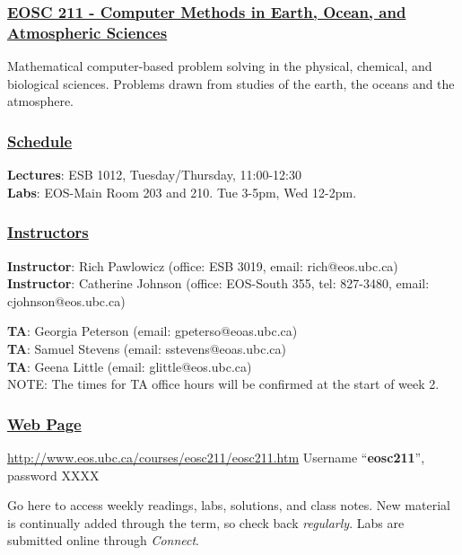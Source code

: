 \documentclass[12pt]{article}
\renewcommand{\section}[1]{\vspace{0pt}\subsubsection*{\underline{\large #1}}\vspace{-10pt}}
\begin{document}
\section{EOSC 211 - Computer Methods in Earth, Ocean, and Atmospheric Sciences}
 
Mathematical computer-based problem solving in the physical, 
chemical, and biological sciences. Problems drawn from studies of 
the earth, the oceans and the atmosphere. 

\section{Schedule}

{\bf Lectures}: ESB 1012, Tuesday/Thursday, 11:00-12:30 \\
{\bf Labs}: EOS-Main Room 203 and 210. Tue 3-5pm, Wed 12-2pm.

\section{Instructors}

{\bf Instructor}: Rich Pawlowicz (office: ESB 3019, 
email: rich@eos.ubc.ca) \\
{\bf Instructor}:  Catherine Johnson    (office: EOS-South 355, tel: 827-3480, 
email: cjohnson@eos.ubc.ca)  


 
{\bf TA}: Georgia Peterson (email: gpeterso@eoas.ubc.ca) \\
{\bf TA}: Samuel Stevens (email: sstevens@eoas.ubc.ca) \\
{\bf TA}: Geena Little (email: glittle@eos.ubc.ca) \\

NOTE:  The times for TA office hours will be confirmed at the start of week 2.

  
\section{Web Page}

\url{http://www.eos.ubc.ca/courses/eosc211/eosc211.htm} \newline
Username ``{\bf eosc211}'', password XXXX

Go here to access weekly readings, labs, solutions, and class notes.  New material is continually added through the term, so check back \emph{regularly}. Labs are submitted online through \emph{Connect}.
\end{document}
